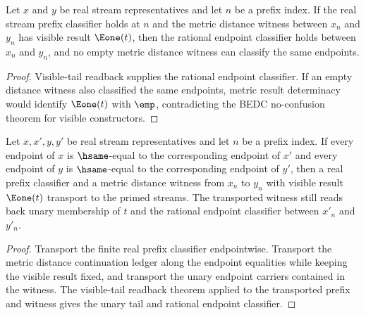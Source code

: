 \begin{theorem}
\label{thm:completion-metric-distance-e1-tail-empty-distance-absurd}
Let $x$ and $y$ be real stream representatives and let $n$ be a prefix index.
If the real stream prefix classifier holds at $n$ and the metric distance
witness between $x_n$ and $y_n$ has visible result $\Eone(t)$, then the
rational endpoint classifier holds between $x_n$ and $y_n$, and no empty
metric distance witness can classify the same endpoints.
\end{theorem}
\begin{proof}
Visible-tail readback supplies the rational endpoint classifier. If an empty
distance witness also classified the same endpoints, metric result
determinacy would identify $\Eone(t)$ with $\emp$, contradicting the BEDC
no-confusion theorem for visible constructors.
\end{proof}

\begin{theorem}
\label{thm:completion-metric-distance-witness-e1-tail-hsame-transport}
Let $x,x',y,y'$ be real stream representatives and let $n$ be a prefix
index. If every endpoint of $x$ is $\hsame$-equal to the corresponding
endpoint of $x'$ and every endpoint of $y$ is $\hsame$-equal to the
corresponding endpoint of $y'$, then a real prefix classifier and a metric
distance witness from $x_n$ to $y_n$ with visible result $\Eone(t)$ transport
to the primed streams. The transported witness still reads back unary
membership of $t$ and the rational endpoint classifier between $x'_n$ and
$y'_n$.
\end{theorem}
\begin{proof}
Transport the finite real prefix classifier endpointwise. Transport the metric
distance continuation ledger along the endpoint equalities while keeping the
visible result fixed, and transport the unary endpoint carriers contained in
the witness. The visible-tail readback theorem applied to the transported
prefix and witness gives the unary tail and rational endpoint classifier.
\end{proof}

